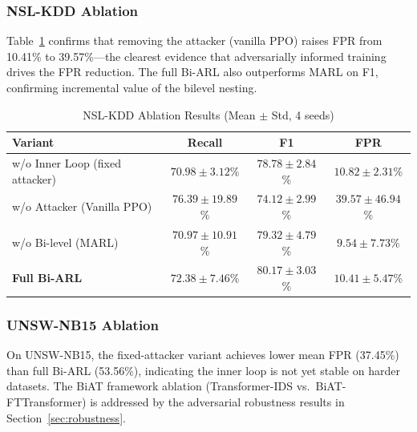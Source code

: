 \subsubsection{NSL-KDD Ablation}

Table~\ref{tab:ablation_nsl} confirms that removing the attacker (vanilla PPO) raises FPR from 10.41\% to 39.57\%---the clearest evidence that adversarially informed training drives the FPR reduction. The full Bi-ARL also outperforms MARL on F1, confirming incremental value of the bilevel nesting.

\begin{table}[h]
    \centering
    \caption{NSL-KDD Ablation Results (Mean $\pm$ Std, 4 seeds)}
    \label{tab:ablation_nsl}
    \begin{tabular}{lccc}
        \toprule
        \textbf{Variant} & \textbf{Recall} & \textbf{F1} & \textbf{FPR} \\
        \midrule
        w/o Inner Loop (fixed attacker) & $70.98{\pm}3.12$\% & $78.78{\pm}2.84$\% & $10.82{\pm}2.31$\% \\
        w/o Attacker (Vanilla PPO)      & $\mathbf{76.39{\pm}19.89}$\% & $74.12{\pm}2.99$\% & $39.57{\pm}46.94$\% \\
        w/o Bi-level (MARL)             & $70.97{\pm}10.91$\% & $79.32{\pm}4.79$\% & $\mathbf{9.54{\pm}7.73}$\% \\
        \midrule
        \textbf{Full Bi-ARL}            & $72.38{\pm}7.46$\% & $\mathbf{80.17{\pm}3.03}$\% & $10.41{\pm}5.47$\% \\
        \bottomrule
    \end{tabular}
\end{table}

\subsubsection{UNSW-NB15 Ablation}

On UNSW-NB15, the fixed-attacker variant achieves lower mean FPR (37.45\%) than full Bi-ARL (53.56\%), indicating the inner loop is not yet stable on harder datasets. The BiAT framework ablation (Transformer-IDS vs.\ BiAT-FTTransformer) is addressed by the adversarial robustness results in Section~\ref{sec:robustness}.

